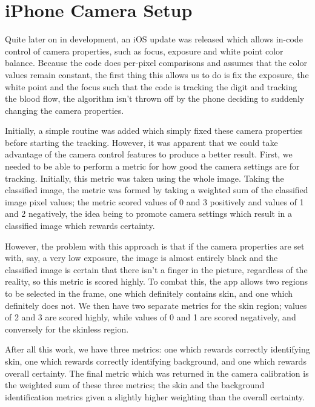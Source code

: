 \section{iPhone Camera Setup}\label{sec:iPhoneCameraSetup}
Quite later on in development, an iOS update was released which allows in-code control of camera properties, such as focus, exposure and white point color balance. Because the code does per-pixel comparisons and assumes that the color values remain constant, the first thing this allows us to do is fix the exposure, the white point and the focus such that the code is tracking the digit and tracking the blood flow, the algorithm isn't thrown off by the phone deciding to suddenly changing the camera properties. 

Initially, a simple routine was added which simply fixed these camera properties before starting the tracking. However, it was apparent that we could take advantage of the camera control features to produce a better result. First, we needed to be able to perform a metric for how good the camera settings are for tracking. Initially, this metric was taken using the whole image. Taking the classified image, the metric was formed by taking a weighted sum of the classified image pixel values; the metric scored values of 0 and 3 positively and values of 1 and 2 negatively, the idea being to promote camera settings which result in a classified image which rewards certainty.

However, the problem with this approach is that if the camera properties are set with, say, a very low exposure, the image is almost entirely black and the classified image is certain that there isn't a finger in the picture, regardless of the reality, so this metric is scored highly. To combat this, the app allows two regions to be selected in the frame, one which definitely contains skin, and one which definitely does not. We then have two separate metrics for the skin region; values of 2 and 3 are scored highly, while values of 0 and 1 are scored negatively, and conversely for the skinless region.

After all this work, we have three metrics: one which rewards correctly identifying skin, one which rewards correctly identifying background, and one which rewards overall certainty. The final metric which was returned in the camera calibration is the weighted sum of these three metrics; the skin and the background identification metrics given a slightly higher weighting than the overall certainty.

